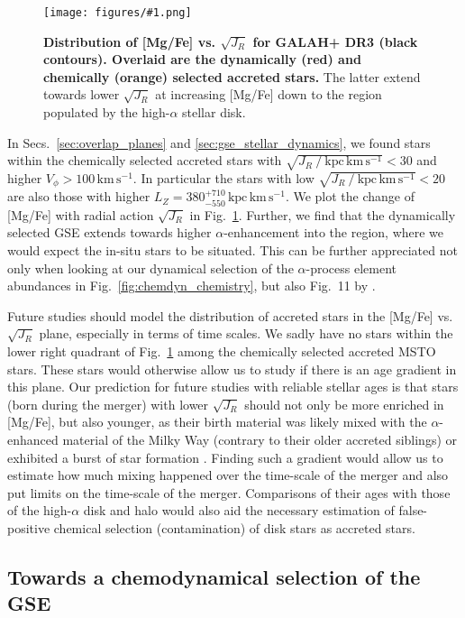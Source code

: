 \documentclass[fleqn,usenatbib]{mnras}
\newcommand{\kpckms}{\,\mathrm{kpc\,km\,s^{-1}}}	%
\newcommand{\codeicon}{{\faCloudDownload}}
\newcommand{\codelink}[1]{\href{https://github.com/svenbuder/Accreted-stars-in-GALAH-DR3/tree/main/figures/#1.ipynb}{\codeicon}\,\,}
\newcommand{\oscaption}[2]{\caption{#2 \codelink{#1}}}
\newcommand{\figurecolumnwidth}[3]{\begin{figure} \centering \texttt{[image: figures/\#1.png]}\oscaption{#2}{#3}\label{fig:#1} \end{figure}}
\begin{document}
\figurecolumnwidth{overlap_mgfe_sqrtjr}{chronochemodynamic_comparison}{
\textbf{Distribution of [Mg/Fe] vs. $\sqrt{J_R}$ for GALAH+ DR3 (black contours). Overlaid are the dynamically (red) and chemically (orange) selected accreted stars.} The latter extend towards lower $\sqrt{J_R}$ at increasing [Mg/Fe] down to the region populated by the high-$\alpha$ stellar disk.
}

In Secs.~\ref{sec:overlap_planes} and \ref{sec:gse_stellar_dynamics}, we found stars within the chemically selected accreted stars with $\sqrt{J_R~/~\mathrm{kpc\,km\,s^{-1}}} < 30$ and higher $V_\phi > 100\,\mathrm{km\,s^{-1}}$. In particular the stars with low $\sqrt{J_R~/~\mathrm{kpc\,km\,s^{-1}}} < 20$ are also those with higher $L_Z = 380_{-550}^{+710}\kpckms$. We plot the change of [Mg/Fe] with radial action $\sqrt{J_R}$ in Fig.~\ref{fig:overlap_mgfe_sqrtjr}. Further, we find that the dynamically selected GSE extends towards higher $\alpha$-enhancement into the region, where we would expect the in-situ stars to be situated. This can be further appreciated not only when looking at our dynamical selection of the $\alpha$-process element abundances in Fig.~\ref{fig:chemdyn_chemistry}, but also Fig.~11 by \citet{Naidu2020}.

Future studies should model the distribution of accreted stars in the [Mg/Fe] vs. $\sqrt{J_R}$ plane, especially in terms of time scales. We sadly have no stars within the lower right quadrant of Fig.~\ref{fig:overlap_mgfe_sqrtjr} among the chemically selected accreted MSTO stars. These stars would otherwise allow us to study if there is an age gradient in this plane. Our prediction for future studies with reliable stellar ages is that stars (born during the merger) with lower $\sqrt{J_R}$ should not only be more enriched in [Mg/Fe], but also younger, as their birth material was likely mixed with the $\alpha$-enhanced material of the Milky Way (contrary to their older accreted siblings) or exhibited a burst of star formation \citep{GilmoreWyse1991}. Finding such a gradient would allow us to estimate how much mixing happened over the time-scale of the merger and also put limits on the time-scale of the merger. Comparisons of their ages with those of the high-$\alpha$ disk and halo would also aid the necessary estimation of false-positive chemical selection (contamination) of disk stars as accreted stars.

\subsection{Towards a chemodynamical selection of the GSE} \label{sec:towards_chemodyn}
\end{document}
